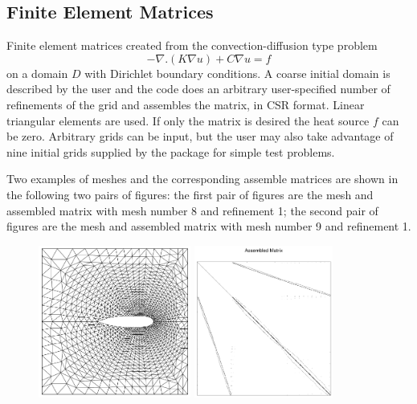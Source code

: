 \documentclass[12pt]{article}
\begin{document}
\subsection{Finite Element Matrices}

Finite element matrices created from the convection-diffusion type problem 
\begin{equation} - \nabla . ({ K \nabla u }) + {C \nabla u} = f \label{kikuchi} 
\end{equation}
on a domain $D$ with Dirichlet boundary conditions.  A coarse initial domain
is described by the user and the code does an arbitrary user-specified number
of refinements of the grid and assembles the matrix, in CSR format.
Linear triangular elements are used.  If only the matrix is desired the heat
source $f$ can be zero. Arbitrary grids can be input, but the user may 
also take advantage of nine initial grids
supplied by the package for simple test problems. 

Two examples of meshes and the corresponding assemble matrices are shown
in the following two pairs of figures: the first pair of figures are the mesh 
and assembled matrix with mesh number 8 and refinement 1; the second pair of
figures are the mesh and assembled matrix with mesh number 9 and refinement 1.

\begin{figure}[b]
\begin{minipage}[h]{6.5cm}
\includegraphics[height=5cm]{msh8} 
\end{minipage}
\hfill
\begin{minipage}[h]{6.5cm}
\includegraphics[height=5cm]{mat8}
\end{minipage}
\hfill
\end{figure}
\end{document}
